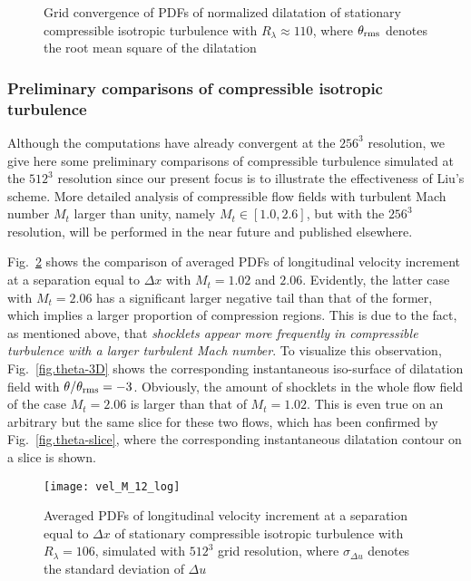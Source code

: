 \documentclass[review]{elsarticle}
\begin{document}
\begin{figure}
  \centering
  \caption{Grid convergence of PDFs of normalized dilatation of stationary compressible isotropic turbulence with $R_\lambda \approx 110$, where $\theta_{\rm rms}$ denotes the root mean square of the dilatation}
  \label{fig.theta-grid}
\end{figure}


\subsubsection{Preliminary comparisons of compressible isotropic turbulence}

Although the computations have already convergent at the $256^3$ resolution, we give here some preliminary comparisons of compressible turbulence simulated at the $512^3$ resolution since our present focus is to illustrate the effectiveness of Liu's scheme. More detailed analysis of compressible flow fields with turbulent Mach number $M_t$ larger than unity, namely $M_t \in [1.0, 2.6]$, but with the $256^3$ resolution, will be performed in the near future and published elsewhere.

Fig.~\ref{fig.velM12} shows the comparison of averaged PDFs of longitudinal velocity increment at a separation equal to $\Delta x$ with $M_t = 1.02$ and $2.06$. Evidently, the latter case with $M_t=2.06$ has a significant larger negative tail than that of the former, which implies a larger proportion of compression regions. This is due to the fact, as mentioned above, that \textit{shocklets appear more frequently in compressible turbulence with a larger turbulent Mach number}. To visualize this observation, Fig.~\ref{fig.theta-3D} shows the corresponding instantaneous iso-surface of dilatation field with $\theta/\theta_{\rm rms} = -3$. Obviously, the amount of shocklets in the whole flow field of the case $M_t=2.06$ is larger than that of $M_t=1.02$. This is even true on an arbitrary but the same slice for these two flows, which has been confirmed by Fig.~\ref{fig.theta-slice}, where the corresponding instantaneous dilatation contour on a slice is shown.

\begin{figure}
  \centering
  \texttt{[image: vel\_M\_12\_log]}
  \caption{Averaged PDFs of longitudinal velocity increment at a separation equal to $\Delta x$ of stationary compressible isotropic turbulence with $R_\lambda = 106$, simulated with $512^3$ grid resolution, where $\sigma_{\Delta u}$ denotes the standard deviation of $\Delta u$}
  \label{fig.velM12}
\end{figure}
\end{document}
